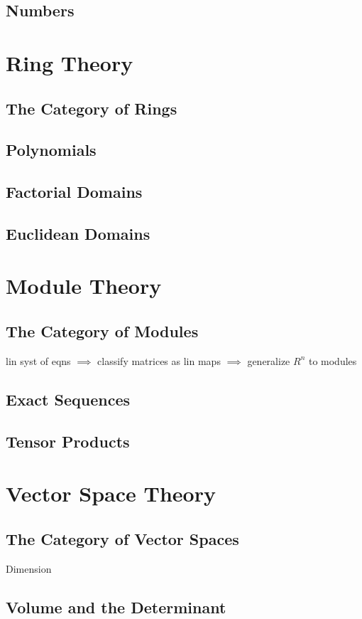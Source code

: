 	\subsection{Numbers}

	\newpage
	\section{Ring Theory}
	\subsection{The Category of Rings}
	\subsection{Polynomials}
	\subsection{Factorial Domains}
	\subsection{Euclidean Domains}

	\newpage
	\section{Module Theory}
	\subsection{The Category of Modules}
	lin syst of eqns $\implies$ classify matrices as lin maps $\implies$ generalize $R^n$ to modules
	\subsection{Exact Sequences}
	\subsection{Tensor Products}

	\newpage
	\section{Vector Space Theory}
	\subsection{The Category of Vector Spaces}
	Dimension
	\subsection{Volume and the Determinant}
